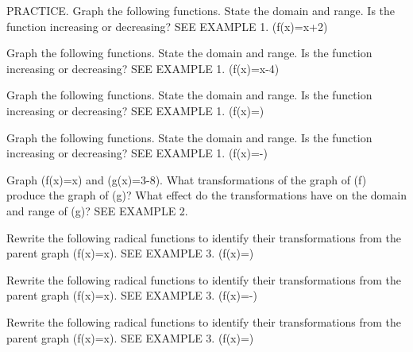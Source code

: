 \documentclass{article}
\newenvironment{practice}[2]{}{}        %
\newcommand{\answer}[1]{}               %
\newcommand{\uncertain}[2]{#1}          %
\newcommand{\te}[1]{}                   %
\begin{document}
\begin{practice}{17}{1}
PRACTICE. Graph the following functions. State the domain and range. Is the function increasing or decreasing? SEE EXAMPLE 1.
(f(x)=\sqrt x+2)
\answer{See back of book.}
\end{practice}
\begin{practice}{18}{1}
Graph the following functions. State the domain and range. Is the function increasing or decreasing? SEE EXAMPLE 1.
(f(x)=\sqrt[3]x-4)
\answer{See back of book.}
\end{practice}
\begin{practice}{19}{1}
Graph the following functions. State the domain and range. Is the function increasing or decreasing? SEE EXAMPLE 1.
(f(x)=)
\answer{See back of book.}
\end{practice}
\begin{practice}{20}{2}
Graph the following functions. State the domain and range. Is the function increasing or decreasing? SEE EXAMPLE 1.
(f(x)=-)
\answer{See back of book.}
\end{practice}
\begin{practice}{21}{3}
Graph (f(x)=\sqrt[3]x) and (g(x)=3-8). What transformations of the graph of (f) produce the graph of (g)? What effect do the transformations have on the domain and range of (g)? SEE EXAMPLE 2.
\answer{See back of book.}
\te{Item 21 is absent from Item Analysis; provisional DOK \uncertain{3}{2; no DOK printed}.}
\end{practice}
\begin{practice}{22}{2}
Rewrite the following radical functions to identify their transformations from the parent graph (f(x)=\sqrt x). SEE EXAMPLE 3.
(f(x)=)
\answer{(f(x)=4\sqrt x); vertical stretch by a factor of 4}
\end{practice}
\begin{practice}{23}{2}
Rewrite the following radical functions to identify their transformations from the parent graph (f(x)=\sqrt x). SEE EXAMPLE 3.
(f(x)=-)
\answer{(f(x)=-5\sqrt{x+3}); reflection about the x-axis, vertical stretch by a factor of 5 and translation 3 units left}
\end{practice}
\begin{practice}{24}{2}
Rewrite the following radical functions to identify their transformations from the parent graph (f(x)=\sqrt x). SEE EXAMPLE 3.
(f(x)=)
\answer{(f(x)=3\sqrt{x-5}); vertical stretch by a factor of 3 and translation 5 units right}
\end{practice}
\end{document}
